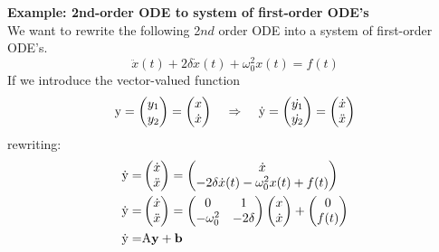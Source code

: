 \textbf{Example: 2nd-order ODE to system of first-order ODE's}\\
We want to rewrite the following 2$nd$ order ODE into a system of first-order ODE's.
\begin{equation}
  \ddot{x}(t) + 2\delta\dot{x}(t) + \omega_0^2x(t) = f(t)
\end{equation}
If we introduce the vector-valued function
\begin{equation}
  \textup{y} = \begin{pmatrix} y_1 \\ y_2 \end{pmatrix} =
                \begin{pmatrix} x \\ \dot{x} \end{pmatrix} \;\;\;\;  \Rightarrow \;\;\;\;
                \dot{\textup{y}} =
                \begin{pmatrix} \dot{y_1} \\ \dot{y_2} \end{pmatrix} =
                \begin{pmatrix} \dot{x} \\ \ddot{x} \end{pmatrix}
\end{equation}
rewriting:
\begin{equation}
  \begin{split}
      \dot{\textup{y}} =& \begin{pmatrix} \dot{x} \\ \ddot{x} \end{pmatrix} =
                          \begin{pmatrix} \dot{x} \\ -2\delta\dot{x}(t) - \omega_0^2x(t) + f(t) \end{pmatrix}\\
      \dot{\textup{y}} =& \begin{pmatrix} \dot{x} \\ \ddot{x} \end{pmatrix} =
                          \begin{pmatrix} 0 & 1 \\ -\omega_0^2 & -2\delta \end{pmatrix}
                          \begin{pmatrix} x\\ \dot{x} \end{pmatrix} +
                          \begin{pmatrix} 0 \\ f(t) \end{pmatrix}\\
      \dot{\textup{y}} =& \textup{A}\textbf{y} + \mathbf{b}
  \end{split}
\end{equation}
